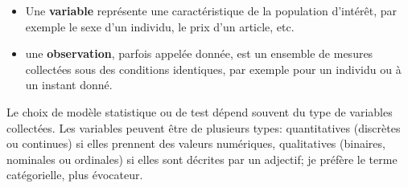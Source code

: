\documentclass[
  11pt,
  letterpaper,
]{scrbook}
\providecommand{\tightlist}{%
  \setlength{\itemsep}{0pt}\setlength{\parskip}{0pt}}\usepackage{longtable,booktabs,array}
\theoremstyle{definition}
\theoremstyle{remark}
\begin{document}
\begin{itemize}
\tightlist
\item
  Une \textbf{variable} représente une caractéristique de la population
  d'intérêt, par exemple le sexe d'un individu, le prix d'un article,
  etc.
\item
  une \textbf{observation}, parfois appelée donnée, est un ensemble de
  mesures collectées sous des conditions identiques, par exemple pour un
  individu ou à un instant donné.
\end{itemize}

Le choix de modèle statistique ou de test dépend souvent du type de
variables collectées. Les variables peuvent être de plusieurs types:
quantitatives (discrètes ou continues) si elles prennent des valeurs
numériques, qualitatives (binaires, nominales ou ordinales) si elles
sont décrites par un adjectif; je préfère le terme catégorielle, plus
évocateur.
\end{document}
